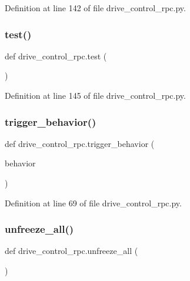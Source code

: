 Definition at line 142 of file drive\+\_\+control\+\_\+rpc.\+py.

\mbox{\label{namespacedrive__control__rpc_af880c1ea22f666df4c3d5fabaec29a80}} 
\subsubsection{\texorpdfstring{test()}{test()}}
{\footnotesize\ttfamily def drive\+\_\+control\+\_\+rpc.\+test (\begin{DoxyParamCaption}{ }\end{DoxyParamCaption})}



Definition at line 145 of file drive\+\_\+control\+\_\+rpc.\+py.

\mbox{\label{namespacedrive__control__rpc_a5e7562b93aab63c234f56a91507cf3b0}} 
\subsubsection{\texorpdfstring{trigger\+\_\+behavior()}{trigger\_behavior()}}
{\footnotesize\ttfamily def drive\+\_\+control\+\_\+rpc.\+trigger\+\_\+behavior (\begin{DoxyParamCaption}\item[{}]{behavior }\end{DoxyParamCaption})}



Definition at line 69 of file drive\+\_\+control\+\_\+rpc.\+py.

\mbox{\label{namespacedrive__control__rpc_a27b4d4d77509f5fd0124fc18b0104de9}} 
\subsubsection{\texorpdfstring{unfreeze\+\_\+all()}{unfreeze\_all()}}
{\footnotesize\ttfamily def drive\+\_\+control\+\_\+rpc.\+unfreeze\+\_\+all (\begin{DoxyParamCaption}{ }\end{DoxyParamCaption})}



